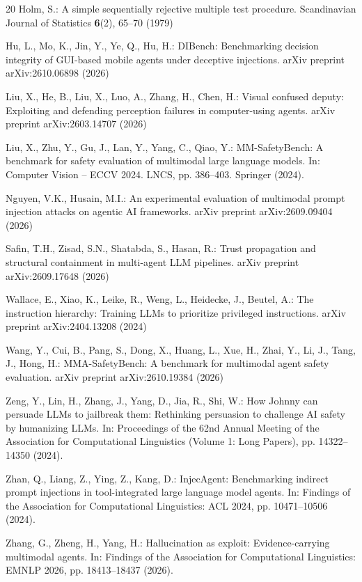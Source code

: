 \documentclass[runningheads]{llncs}
\begin{document}
\begin{thebibliography}{20}
Holm, S.: A simple sequentially rejective multiple test procedure. Scandinavian Journal of Statistics \textbf{6}(2), 65--70 (1979)

Hu, L., Mo, K., Jin, Y., Ye, Q., Hu, H.: DIBench: Benchmarking decision integrity of GUI-based mobile agents under deceptive injections. arXiv preprint arXiv:2610.06898 (2026)

Liu, X., He, B., Liu, X., Luo, A., Zhang, H., Chen, H.: Visual confused deputy: Exploiting and defending perception failures in computer-using agents. arXiv preprint arXiv:2603.14707 (2026)

Liu, X., Zhu, Y., Gu, J., Lan, Y., Yang, C., Qiao, Y.: MM-SafetyBench: A benchmark for safety evaluation of multimodal large language models. In: Computer Vision -- ECCV 2024. LNCS, pp. 386--403. Springer (2024). 

Nguyen, V.K., Husain, M.I.: An experimental evaluation of multimodal prompt injection attacks on agentic AI frameworks. arXiv preprint arXiv:2609.09404 (2026)

Safin, T.H., Zisad, S.N., Shatabda, S., Hasan, R.: Trust propagation and structural containment in multi-agent LLM pipelines. arXiv preprint arXiv:2609.17648 (2026)

Wallace, E., Xiao, K., Leike, R., Weng, L., Heidecke, J., Beutel, A.: The instruction hierarchy: Training LLMs to prioritize privileged instructions. arXiv preprint arXiv:2404.13208 (2024)

Wang, Y., Cui, B., Pang, S., Dong, X., Huang, L., Xue, H., Zhai, Y., Li, J., Tang, J., Hong, H.: MMA-SafetyBench: A benchmark for multimodal agent safety evaluation. arXiv preprint arXiv:2610.19384 (2026)

Zeng, Y., Lin, H., Zhang, J., Yang, D., Jia, R., Shi, W.: How Johnny can persuade LLMs to jailbreak them: Rethinking persuasion to challenge AI safety by humanizing LLMs. In: Proceedings of the 62nd Annual Meeting of the Association for Computational Linguistics (Volume 1: Long Papers), pp. 14322--14350 (2024). 

Zhan, Q., Liang, Z., Ying, Z., Kang, D.: InjecAgent: Benchmarking indirect prompt injections in tool-integrated large language model agents. In: Findings of the Association for Computational Linguistics: ACL 2024, pp. 10471--10506 (2024). 

Zhang, G., Zheng, H., Yang, H.: Hallucination as exploit: Evidence-carrying multimodal agents. In: Findings of the Association for Computational Linguistics: EMNLP 2026, pp. 18413--18437 (2026). 

\end{thebibliography}
\end{document}
